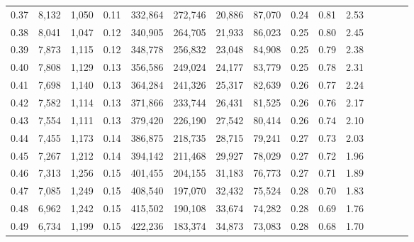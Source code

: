 \begin{tabular}{rrrcrrrrrrrrrrr}
0.37 &   8,132 &  1,050 &                                       0.11 &  332,864 &  272,746 &   20,886 &   87,070 &  0.24 &  0.81 &                         2.53 \\
0.38 &   8,041 &  1,047 &                                       0.12 &  340,905 &  264,705 &   21,933 &   86,023 &  0.25 &  0.80 &                         2.45 \\
0.39 &   7,873 &  1,115 &                                       0.12 &  348,778 &  256,832 &   23,048 &   84,908 &  0.25 &  0.79 &                         2.38 \\
0.40 &   7,808 &  1,129 &                                       0.13 &  356,586 &  249,024 &   24,177 &   83,779 &  0.25 &  0.78 &                         2.31 \\
0.41 &   7,698 &  1,140 &                                       0.13 &  364,284 &  241,326 &   25,317 &   82,639 &  0.26 &  0.77 &                         2.24 \\
0.42 &   7,582 &  1,114 &                                       0.13 &  371,866 &  233,744 &   26,431 &   81,525 &  0.26 &  0.76 &                         2.17 \\
0.43 &   7,554 &  1,111 &                                       0.13 &  379,420 &  226,190 &   27,542 &   80,414 &  0.26 &  0.74 &                         2.10 \\
0.44 &   7,455 &  1,173 &                                       0.14 &  386,875 &  218,735 &   28,715 &   79,241 &  0.27 &  0.73 &                         2.03 \\
0.45 &   7,267 &  1,212 &                                       0.14 &  394,142 &  211,468 &   29,927 &   78,029 &  0.27 &  0.72 &                         1.96 \\
0.46 &   7,313 &  1,256 &                                       0.15 &  401,455 &  204,155 &   31,183 &   76,773 &  0.27 &  0.71 &                         1.89 \\
0.47 &   7,085 &  1,249 &                                       0.15 &  408,540 &  197,070 &   32,432 &   75,524 &  0.28 &  0.70 &                         1.83 \\
0.48 &   6,962 &  1,242 &                                       0.15 &  415,502 &  190,108 &   33,674 &   74,282 &  0.28 &  0.69 &                         1.76 \\
0.49 &   6,734 &  1,199 &                                       0.15 &  422,236 &  183,374 &   34,873 &   73,083 &  0.28 &  0.68 &                         1.70 \\

\end{tabular}

